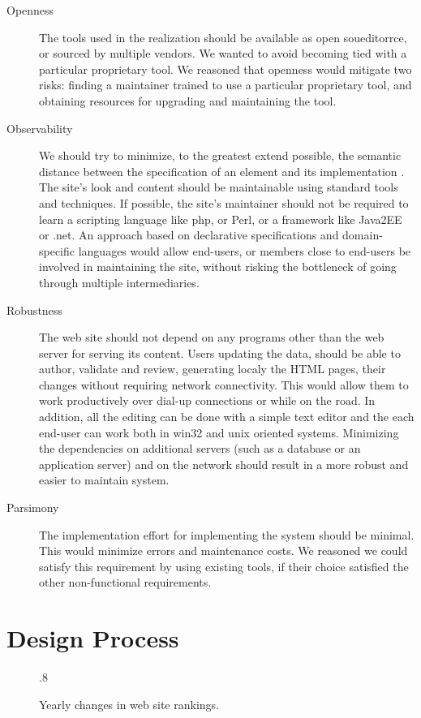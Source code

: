 \documentclass[10pt]{article}
\def\epsfsize#1#2{\ifdim#1>\columnwidth\columnwidth\else#1\fi}
\begin{document}
\begin{description}
\item[Openness] The tools used in the realization
should be available as open soueditorrce, or sourced by multiple vendors.
We wanted to avoid becoming tied with a particular proprietary
tool.
We reasoned that openness would mitigate two risks:
finding a maintainer trained to use a particular proprietary tool,
and obtaining resources for upgrading and maintaining the tool.

\item[Observability]
We should try to minimize,
to the greatest extend possible, the semantic distance between
the specification of an element and its implementation \cite{SG97}.
The site's look and content should be maintainable
using standard tools and techniques.
If possible, the site's maintainer should not be required to
learn a scripting language like {\sc php}, or Perl, or
a framework like Java2EE or {\sc .net}.
An approach based on declarative specifications and
domain-specific languages would allow end-users, or members
close to end-users be involved in maintaining the site,
without risking the bottleneck of going through
multiple intermediaries.

\item[Robustness] The web site should not depend on
any programs other than the web server for serving
its content.
Users updating the data, should be able to author, validate and 
review, generating localy the HTML pages, 
their changes without requiring network connectivity.
This would allow them to work productively over dial-up connections
or while on the road. In addition, all the editing can be done with 
a simple text editor and the each end-user can work both in win32 and unix oriented systems.
Minimizing the dependencies on additional servers (such as a
database or an application server) and on the network
should result in a more robust and easier to maintain system.   

\item[Parsimony] The implementation effort for
implementing the system should be minimal.
This would minimize errors and maintenance costs.
We reasoned we could satisfy this requirement by
using existing tools, if their choice satisfied the
other non-functional requirements.

\end{description} 

\section{Design Process}
\label{sec:design}
\begin{figure}
\begin{center}
\leavevmode
\def\epsfsize#1#2{\epsfxsize}
\epsfysize.8\vsize
{}
\end{center}
\caption{
\label{fig:rankyear}
Yearly changes in web site rankings.}
\end{figure}
\end{document}
